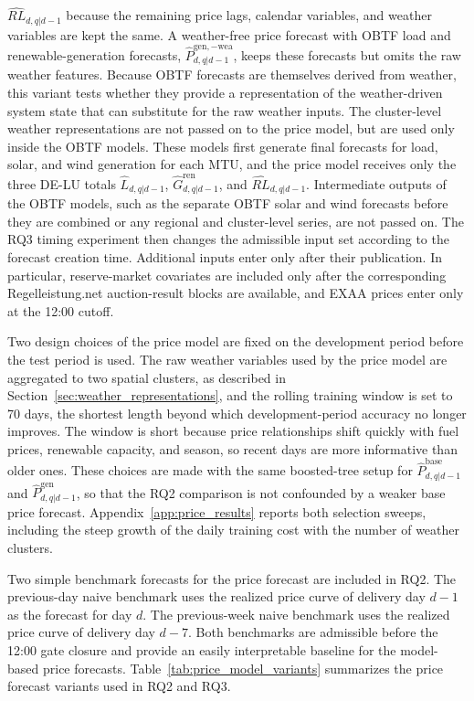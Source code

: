 \(\widehat{RL}_{d,q|d-1}\) because the remaining price lags, calendar
variables, and weather variables are kept the same.
A weather-free price forecast with OBTF load and renewable-generation forecasts,
\(\hat{P}^{\mathrm{gen},-\mathrm{wea}}_{d,q|d-1}\), keeps these forecasts but omits the raw weather features. Because OBTF forecasts are themselves derived from weather, this variant tests
whether they provide a representation of the weather-driven system state that
can substitute for the raw weather inputs.
The cluster-level weather representations are not passed on to the price
model, but are used only inside the OBTF models. These models
first generate final forecasts for load, solar, and wind generation
for each MTU, and the price model receives only the three \mbox{DE-LU} totals
\(\hat{L}_{d,q|d-1}\), \(\hat{G}^{\mathrm{ren}}_{d,q|d-1}\), and
\(\widehat{RL}_{d,q|d-1}\). Intermediate outputs of the OBTF models, such as the separate OBTF solar and wind forecasts before they are combined or any
regional and cluster-level series, are not passed on.
The RQ3 timing experiment then changes the admissible input set according to
the forecast creation time. Additional inputs enter only after their
publication. In particular, reserve-market covariates are included only after
the corresponding Regelleistung.net auction-result blocks are available, and
EXAA prices enter only at the 12:00 cutoff.

Two design choices of the price model are fixed on the development period before
the test period is used. The raw weather variables used by the price model are aggregated to
two spatial clusters, as described in Section~\ref{sec:weather_representations},
and the rolling training window is set to 70 days, the shortest length beyond
which development-period accuracy no longer improves. The window is short
because price relationships shift quickly with fuel prices, renewable capacity,
and season, so recent days are more informative than older ones. These choices
are made with
the same boosted-tree setup for \(\hat{P}^{\mathrm{base}}_{d,q|d-1}\) and
\(\hat{P}^{\mathrm{gen}}_{d,q|d-1}\), so that the RQ2 comparison is not confounded
by a weaker base price forecast.
Appendix~\ref{app:price_results} reports both selection sweeps, including the
steep growth of the daily training cost with the number of weather clusters.

Two simple benchmark forecasts for the price forecast are included in
RQ2. The previous-day naive benchmark uses the realized price curve of delivery
day \(d-1\) as the forecast for day \(d\). The previous-week naive benchmark
uses the realized price curve of delivery day \(d-7\). Both benchmarks are
admissible before the 12:00 gate closure and provide an easily
interpretable baseline for the model-based price forecasts.
Table~\ref{tab:price_model_variants} summarizes the price forecast variants used
in RQ2 and RQ3.

